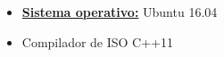 \begin{itemize}
    \item \underline{\textbf{Sistema operativo:}} Ubuntu 16.04
    \item Compilador de ISO C++11
\end{itemize}
